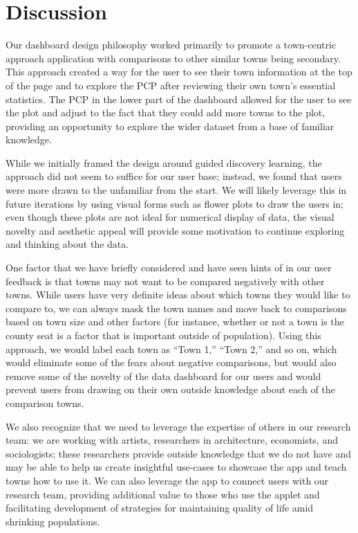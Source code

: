 \documentclass[print]{nuthesis}
\begin{document}
\hypertarget{discussion}{%
\section{Discussion}\label{discussion}}

Our dashboard design philosophy worked primarily to promote a town-centric approach application with comparisons to other similar towns being secondary. This approach created a way for the user to see their town information at the top of the page and to explore the PCP after reviewing their own town's essential statistics. The PCP in the lower part of the dashboard allowed for the user to see the plot and adjust to the fact that they could add more towns to the plot, providing an opportunity to explore the wider dataset from a base of familiar knowledge.

While we initially framed the design around guided discovery learning, the approach did not seem to suffice for our user base; instead, we found that users were more drawn to the unfamiliar from the start. We will likely leverage this in future iterations by using visual forms such as flower plots to draw the users in; even though these plots are not ideal for numerical display of data, the visual novelty and aesthetic appeal will provide some motivation to continue exploring and thinking about the data.

One factor that we have briefly considered and have seen hints of in our user feedback is that towns may not want to be compared negatively with other towns. While users have very definite ideas about which towns they would like to compare to, we can always mask the town names and move back to comparisons based on town size and other factors (for instance, whether or not a town is the county seat is a factor that is important outside of population). Using this approach, we would label each town as ``Town 1,'' ``Town 2,'' and so on, which would eliminate some of the fears about negative comparisons, but would also remove some of the novelty of the data dashboard for our users and would prevent users from drawing on their own outside knowledge about each of the comparison towns.

We also recognize that we need to leverage the expertise of others in our research team: we are working with artists, researchers in architecture, economists, and sociologists; these researchers provide outside knowledge that we do not have and may be able to help us create insightful use-cases to showcase the app and teach towns how to use it. We can also leverage the app to connect users with our research team, providing additional value to those who use the applet and facilitating development of strategies for maintaining quality of life amid shrinking populations.
\end{document}
